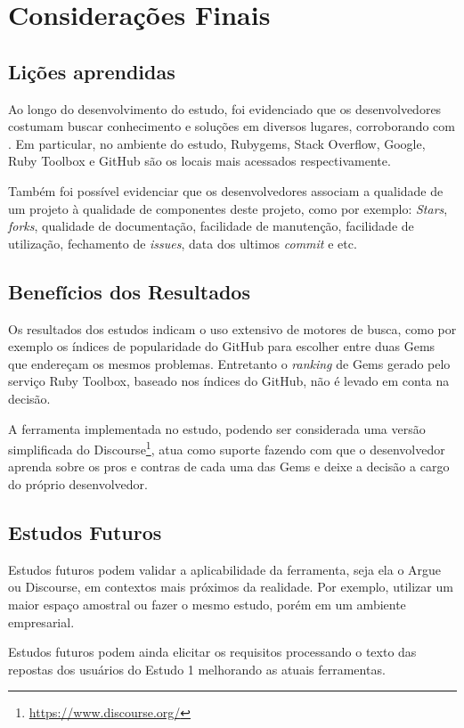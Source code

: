 \chapter{Considerações Finais}

\section{Lições aprendidas}

Ao longo do desenvolvimento do estudo, foi evidenciado que os desenvolvedores costumam buscar conhecimento e soluções em diversos lugares, corroborando com \cite{parnin2012crowd}. Em particular, no ambiente do estudo, Rubygems, Stack Overflow, Google, Ruby Toolbox e GitHub são os locais mais acessados respectivamente.

Também foi possível evidenciar que os desenvolvedores associam a qualidade de um projeto à qualidade de componentes deste projeto, como por exemplo: \textit{Stars}, \textit{forks}, qualidade de documentação, facilidade de manutenção, facilidade de utilização, fechamento de \textit{issues}, data dos ultimos \textit{commit} e etc.

\section{Benefícios dos Resultados}

Os resultados dos estudos indicam o uso extensivo de motores de busca, como por exemplo os índices de popularidade do GitHub para escolher entre duas Gems que endereçam os mesmos problemas. Entretanto o \textit{ranking} de Gems gerado pelo serviço Ruby Toolbox, baseado nos índices do GitHub, não é levado em conta na decisão.

A ferramenta implementada no estudo, podendo ser considerada uma versão simplificada do Discourse\footnote{\url{https://www.discourse.org/}}, atua como suporte fazendo com que o desenvolvedor aprenda sobre os pros e contras de cada uma das Gems e deixe a decisão a cargo do próprio desenvolvedor.

\section{Estudos Futuros}

Estudos futuros podem validar a aplicabilidade da ferramenta, seja ela o Argue ou Discourse, em contextos mais próximos da realidade. Por exemplo, utilizar um maior espaço amostral ou fazer o mesmo estudo, porém em um ambiente empresarial.

Estudos futuros podem ainda elicitar os requisitos processando o texto das repostas dos usuários do Estudo 1 melhorando as atuais ferramentas.



